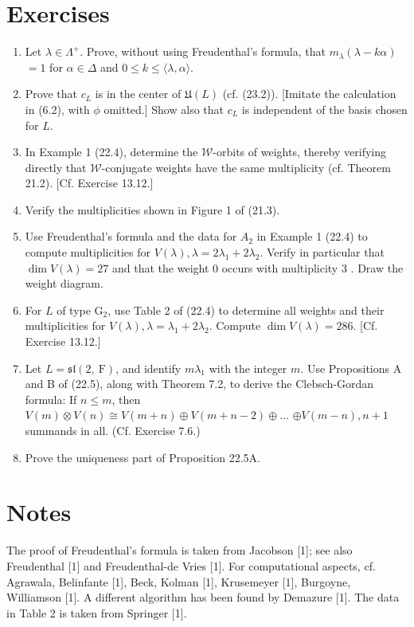 \documentclass[10pt]{article}
\begin{document}
\section*{Exercises}
\begin{enumerate}
  \item Let $\lambda \in \Lambda^{+}$. Prove, without using Freudenthal's formula, that $m_{\lambda}(\lambda-k \alpha)$ $=1$ for $\alpha \in \Delta$ and $0 \leq k \leq\langle\lambda, \alpha\rangle$.
  \item Prove that $c_{L}$ is in the center of $\mathfrak{U}(L)$ (cf. (23.2)). [Imitate the calculation in (6.2), with $\phi$ omitted.] Show also that $c_{L}$ is independent of the basis chosen for $L$.
  \item In Example 1 (22.4), determine the $\mathscr{W}$-orbits of weights, thereby verifying directly that $\mathscr{W}$-conjugate weights have the same multiplicity (cf. Theorem 21.2). [Cf. Exercise 13.12.]
  \item Verify the multiplicities shown in Figure 1 of (21.3).
  \item Use Freudenthal's formula and the data for $A_{2}$ in Example 1 (22.4) to compute multiplicities for $V(\lambda), \lambda=2 \lambda_{1}+2 \lambda_{2}$. Verify in particular that $\operatorname{dim} V(\lambda)=27$ and that the weight 0 occurs with multiplicity 3 . Draw the weight diagram.
  \item For $L$ of type $\mathrm{G}_{2}$, use Table 2 of (22.4) to determine all weights and their multiplicities for $V(\lambda), \lambda=\lambda_{1}+2 \lambda_{2}$. Compute $\operatorname{dim} V(\lambda)=286$. [Cf. Exercise 13.12.]
  \item Let $L=\mathfrak{s l}(2, \mathrm{~F})$, and identify $m \lambda_{1}$ with the integer $m$. Use Propositions A and B of (22.5), along with Theorem 7.2, to derive the Clebsch-Gordan formula: If $n \leq m$, then $V(m) \otimes V(n) \cong V(m+n) \oplus V(m+n-2) \oplus \ldots$ $\oplus V(m-n), n+1$ summands in all. (Cf. Exercise 7.6.)
  \item Prove the uniqueness part of Proposition 22.5A.
\end{enumerate}

\section*{Notes}
The proof of Freudenthal's formula is taken from Jacobson [1]; see also Freudenthal [1] and Freudenthal-de Vries [1]. For computational aspects, cf. Agrawala, Belinfante [1], Beck, Kolman [1], Krusemeyer [1], Burgoyne, Williamson [1]. A different algorithm has been found by Demazure [1]. The data in Table 2 is taken from Springer [1].
\end{document}
